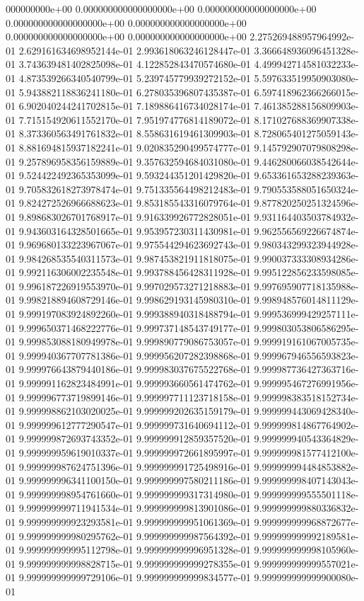 000000000e+00	0.000000000000000000e+00	0.000000000000000000e+00	0.000000000000000000e+00	0.000000000000000000e+00	0.000000000000000000e+00	0.000000000000000000e+00	2.275269488957964992e-01	2.629161634698952144e-01	2.993618063246128447e-01	3.366648936096451328e-01	3.743639481402825098e-01	4.122852843470574680e-01	4.499942714581032233e-01	4.873539266340540799e-01	5.239745779939272152e-01	5.597633519950903080e-01	5.943882118836241180e-01	6.278035396807435387e-01	6.597418962366266015e-01	6.902040244241702815e-01	7.189886416734028174e-01	7.461385288156809903e-01	7.715154920611552170e-01	7.951974776814189072e-01	8.171027688369907338e-01	8.373360563491761832e-01	8.558631619461309903e-01	8.728065401275059143e-01	8.881694815937182241e-01	9.020835290499574777e-01	9.145792907079808298e-01	9.257896958356159889e-01	9.357632594684031080e-01	9.446280066038542644e-01	9.524422492365353099e-01	9.593244351201429820e-01	9.653361653288239363e-01	9.705832618273978474e-01	9.751335564498212483e-01	9.790553588051650324e-01	9.824272526966688623e-01	9.853185543316079764e-01	9.877820250251324596e-01	9.898683026701768917e-01	9.916339926772828051e-01	9.931164403503784932e-01	9.943603164328501665e-01	9.953957230311430981e-01	9.962556569226674874e-01	9.969680133223967067e-01	9.975544294623692743e-01	9.980343299323944928e-01	9.984268535540311573e-01	9.987453821911818075e-01	9.990037333308934286e-01	9.992116306002235548e-01	9.993788456428311928e-01	9.995122856233598085e-01	9.996187226919553970e-01	9.997029573271218883e-01	9.997695907718135988e-01	9.998218894608729146e-01	9.998629193145980310e-01	9.998948576014811129e-01	9.999197083924892260e-01	9.999388940318488794e-01	9.999536999429257111e-01	9.999650371468222776e-01	9.999737148543749177e-01	9.999803053806586295e-01	9.999853088180949978e-01	9.999890779086753057e-01	9.999919161067005735e-01	9.999940367707781386e-01	9.999956207282398868e-01	9.999967946556593823e-01	9.999976643879440186e-01	9.999983037675522768e-01	9.999987736427363716e-01	9.999991162823484991e-01	9.999993660561474762e-01	9.999995467276991956e-01	9.999996773719899146e-01	9.999997711123718158e-01	9.999998383518152734e-01	9.999998862103020025e-01	9.999999202635159179e-01	9.999999443069428340e-01	9.999999612777290547e-01	9.999999731640694112e-01	9.999999814867764902e-01	9.999999872693743352e-01	9.999999912859357520e-01	9.999999940543364829e-01	9.999999959619010337e-01	9.999999972661895997e-01	9.999999981577412100e-01	9.999999987624751396e-01	9.999999991725498916e-01	9.999999994484853882e-01	9.999999996341100150e-01	9.999999997580211186e-01	9.999999998407143043e-01	9.999999998954761660e-01	9.999999999317314980e-01	9.999999999555501118e-01	9.999999999711941534e-01	9.999999999813901086e-01	9.999999999880336832e-01	9.999999999923293581e-01	9.999999999951061369e-01	9.999999999968872677e-01	9.999999999980295762e-01	9.999999999987564392e-01	9.999999999992189581e-01	9.999999999995112798e-01	9.999999999996951328e-01	9.999999999998105960e-01	9.999999999998828715e-01	9.999999999999278355e-01	9.999999999999557021e-01	9.999999999999729106e-01	9.999999999999834577e-01	9.999999999999900080e-01

